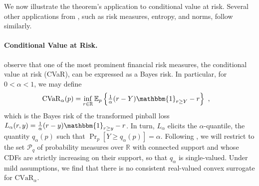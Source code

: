 \documentclass[11pt]{article} %
\newcommand{\reals}{\mathbb{R}}
\newcommand{\prop}[2][\mathcal{P}]{\mathrm{prop}_{#1}[#2]}
\newcommand{\affhull}{\mathrm{affhull}}
\newcommand{\E}{\mathbb{E}}
\renewcommand{\P}{\mathcal{P}}
\newcommand{\Y}{\mathcal{Y}}
\newcommand{\lbar}{\underline{L}} %
\newcommand{\CVaR}{\mathrm{CVaR}}
\newcommand{\ones}{\mathbbm{1}}
\begin{document}

We now illustrate the theorem's application to conditional value at risk.
Several other applications from \citet{frongillo2020elicitation}, such as risk measures, entropy, and norms, follow similarly.


\paragraph{Conditional Value at Risk.}

\citet{frongillo2020elicitation} observe that one of the most prominent financial risk measures, the conditional value at risk (CVaR), can be expressed as a Bayes risk.
In particular, for $0 < \alpha < 1$, we may define
\begin{align}
  \CVaR_\alpha(p)
  &= \inf_{r\in\reals} \E_p\left\{ \tfrac 1 \alpha(r-Y)\ones_{r\geq Y}- r\right\}~,
  \label{eq:elic-complex-es-3}
\end{align}
which is the Bayes risk of the transformed pinball loss $L_\alpha(r,y) = \tfrac 1 \alpha(r-y)\ones_{r\geq y}-r$.
In turn, $L_\alpha$ elicits the $\alpha$-quantile, the quantity $q_\alpha(p)$ such that $\Pr_p[Y \geq q_\alpha(p)] = \alpha$.
Following \citet{frongillo2020elicitation}, we will restrict to the set $\P_q$ of probability measures over $\reals$ with connected support and whose CDFs are strictly increasing on their support, so that $q_\alpha$ is single-valued.
Under mild assumptions, we find that there is no consistent real-valued convex surrogate for $\CVaR_\alpha$.
\end{document}
